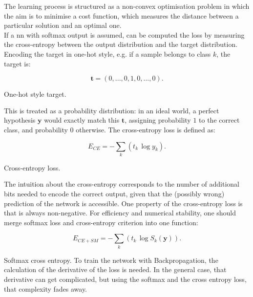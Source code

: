 \noindent The learning process is structured as a non-convex optimisation problem in which the aim is to minimise a cost function, which measures the distance between a particular solution and an optimal one. \\

\noindent If a \gls{nn} with softmax output is assumed, can be computed the loss by measuring the cross-entropy between the output distribution and the target distribution. \\

\noindent Encoding the target in one-hot style, e.g. if a sample belongs to class $k$, the target is:

\begin{Equation}[H]
	\centering
	\begin{equation} \label{eq:nnclass3}
		\bm{t}=(0,...,0,1,0,...,0) .
	\end{equation}
	\caption[One-hot style target.]{One-hot style target.}
\end{Equation}

\noindent This is treated as a probability distribution: in an ideal world, a perfect hypothesis $\bm{y}$ would exactly match this $\bm{t}$, assigning probability $1$ to the correct class, and probability $0$ otherwise. The cross-entropy loss is defined as:

\begin{Equation}[H]
	\centering
	\begin{equation} \label{eq:cross-entropy}
		E_{CE} = -\sum_{k}(t_k \, \log y_k) .
	\end{equation}
	\caption[Cross-entropy loss.]{Cross-entropy loss.}
\end{Equation}

\noindent The intuition about the cross-entropy corresponds to the number of additional bits needed to encode the correct output, given that the (possibly wrong) prediction of the network is accessible. One property of the cross-entropy loss is that is always non-negative. For efficiency and numerical stability, one should merge softmax loss and cross-entropy criterion into one function:

\begin{Equation}[H]
	\centering
	\begin{equation}
		E_{CE+SM} = -\sum_{k}(t_k \, \log S_k(\bm{y})) .
	\end{equation}
	\caption[Softmax cross entropy.]{Softmax cross entropy. To train the network with Backpropagation, the calculation of the derivative of the loss is needed. In the general case, that derivative can get complicated, but using the softmax and the cross entropy loss, that complexity fades away.}
	\label{eq:softmaxcrossentr}
\end{Equation}

